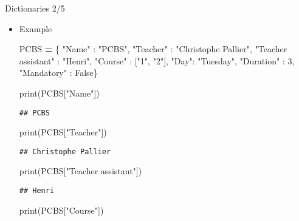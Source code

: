 \documentclass[
  8pt,
  ignorenonframetext,
]{beamer}
\newenvironment{Shaded}{\begin{snugshade}}{\end{snugshade}}
\newcommand{\BuiltInTok}[1]{#1}
\newcommand{\DecValTok}[1]{\textcolor[rgb]{0.00,0.00,0.81}{#1}}
\newcommand{\NormalTok}[1]{#1}
\newcommand{\OperatorTok}[1]{\textcolor[rgb]{0.81,0.36,0.00}{\textbf{#1}}}
\newcommand{\StringTok}[1]{\textcolor[rgb]{0.31,0.60,0.02}{#1}}
\newcommand{\VariableTok}[1]{\textcolor[rgb]{0.00,0.00,0.00}{#1}}
\begin{document}
\begin{frame}[fragile]{Dictionaries 2/5}
\protect\hypertarget{dictionaries-25}{}
\begin{itemize}[<+->]
\item
  Example

\begin{Shaded}
\begin{Highlighting}[]
\NormalTok{PCBS }\OperatorTok{=}\NormalTok{ \{}
\StringTok{"Name"}\NormalTok{ : }\StringTok{"PCBS"}\NormalTok{,}
\StringTok{"Teacher"}\NormalTok{ : }\StringTok{"Christophe Pallier"}\NormalTok{,}
\StringTok{"Teacher assistant"}\NormalTok{ : }\StringTok{"Henri"}\NormalTok{,}
\StringTok{"Course"}\NormalTok{ : [}\StringTok{"1"}\NormalTok{, }\StringTok{"2"}\NormalTok{],}
\StringTok{"Day"}\NormalTok{: }\StringTok{"Tuesday"}\NormalTok{,}
\StringTok{"Duration"}\NormalTok{ : }\DecValTok{3}\NormalTok{,}
\StringTok{"Mandatory"}\NormalTok{ : }\VariableTok{False}\NormalTok{\}}

\BuiltInTok{print}\NormalTok{(PCBS[}\StringTok{"Name"}\NormalTok{])}
\end{Highlighting}
\end{Shaded}

\begin{verbatim}
## PCBS
\end{verbatim}

\begin{Shaded}
\begin{Highlighting}[]
\BuiltInTok{print}\NormalTok{(PCBS[}\StringTok{"Teacher"}\NormalTok{])}
\end{Highlighting}
\end{Shaded}

\begin{verbatim}
## Christophe Pallier
\end{verbatim}

\begin{Shaded}
\begin{Highlighting}[]
\BuiltInTok{print}\NormalTok{(PCBS[}\StringTok{"Teacher assistant"}\NormalTok{])}
\end{Highlighting}
\end{Shaded}

\begin{verbatim}
## Henri
\end{verbatim}

\begin{Shaded}
\begin{Highlighting}[]
\BuiltInTok{print}\NormalTok{(PCBS[}\StringTok{"Course"}\NormalTok{])}
\end{Highlighting}
\end{Shaded}


\end{itemize}
\end{frame}
\end{document}
